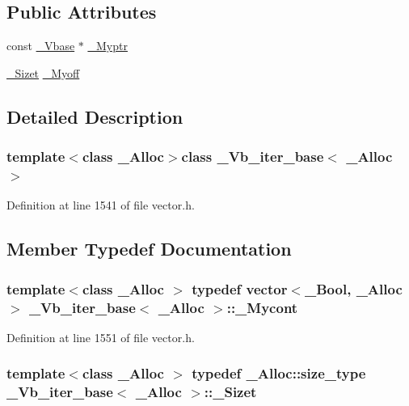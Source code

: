 \subsection*{Public Attributes}
\begin{DoxyCompactItemize}
\item 
const \hyperlink{vector_8h_a1555a2f621ba9ade75bb9ce8bca77144}{\+\_\+\+Vbase} $\ast$ \hyperlink{class___vb__iter__base_a5b1b58fc2e3a55121f0c227c8077fb05}{\+\_\+\+Myptr}
\item 
\hyperlink{class___vb__iter__base_a43b848fb198e38fc0e831a270c07a60d}{\+\_\+\+Sizet} \hyperlink{class___vb__iter__base_a83e2c6bfcf7b8ba34cf6b80997a24b25}{\+\_\+\+Myoff}
\end{DoxyCompactItemize}


\subsection{Detailed Description}
\subsubsection*{template$<$class \+\_\+\+Alloc$>$class \+\_\+\+Vb\+\_\+iter\+\_\+base$<$ \+\_\+\+Alloc $>$}



Definition at line 1541 of file vector.\+h.



\subsection{Member Typedef Documentation}
\hypertarget{class___vb__iter__base_af0f146606d0f7f220d58bfa7ffada3b7}{
\subsubsection[{\+\_\+\+Mycont}]{\setlength{\rightskip}{0pt plus 5cm}template$<$class \+\_\+\+Alloc $>$ typedef {\bf vector}$<$\+\_\+\+Bool, \+\_\+\+Alloc$>$ {\bf \+\_\+\+Vb\+\_\+iter\+\_\+base}$<$ \+\_\+\+Alloc $>$\+::{\bf \+\_\+\+Mycont}}}\label{class___vb__iter__base_af0f146606d0f7f220d58bfa7ffada3b7}


Definition at line 1551 of file vector.\+h.

\hypertarget{class___vb__iter__base_a43b848fb198e38fc0e831a270c07a60d}{
\subsubsection[{\+\_\+\+Sizet}]{\setlength{\rightskip}{0pt plus 5cm}template$<$class \+\_\+\+Alloc $>$ typedef \+\_\+\+Alloc\+::size\+\_\+type {\bf \+\_\+\+Vb\+\_\+iter\+\_\+base}$<$ \+\_\+\+Alloc $>$\+::{\bf \+\_\+\+Sizet}}}\label{class___vb__iter__base_a43b848fb198e38fc0e831a270c07a60d}


